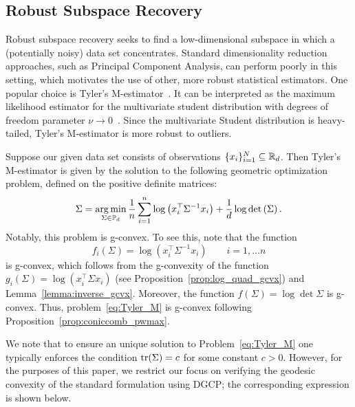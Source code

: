 \documentclass[twoside,11pt]{article}
\begin{document}
\subsection{Robust Subspace Recovery}
Robust subspace recovery seeks to find a low-dimensional subspace in which a (potentially noisy) data set concentrates. Standard dimensionality reduction approaches, such as Principal Component Analysis, can perform poorly in this setting, which motivates the use of other, more robust statistical estimators. One popular choice is Tyler's M-estimator~\citep{Tyler1987}. It can be interpreted as the maximum likelihood estimator for the multivariate student distribution with degrees of freedom parameter $\nu \to 0$~\citep{Maronna2006}. Since the multivariate Student distribution is heavy-tailed, Tyler's M-estimator is more robust to outliers.

Suppose our given data set consists of observations $\{x_i\}_{i=1}^N \subseteq \mathbb{R}_d$. Then Tyler's M-estimator is given by the solution to the following geometric optimization problem, defined on the positive definite matrices:
\begin{equation}\label{eq:Tyler_M}
    \Sigma = \operatorname*{arg\,min}_{\Sigma \in \mathbb{P}_d} \frac{1}{n}\sum_{i=1}^n \log \left(x_i^\top \Sigma^{-1}x_i\right) + \frac{1}{d}\log \det \left(\Sigma \right).
\end{equation}
Notably, this problem is g-convex. To see this, note that the function 
\[
f_i(\Sigma) = \log \left(x_i^\top \Sigma^{-1}x_i\right) \qquad i = 1, \ldots n
\]
is g-convex, which follows from the g-convexity of the function $g_i(\Sigma) = \log \left( x_i^\top \Sigma x_i\right)$ (see Proposition~\ref{prop:log_quad_gcvx}) and Lemma~\ref{lemma:inverse_gcvx}. Moreover, the function $f(\Sigma) = \log \det \Sigma$ is g-convex. Thus, problem~\ref{eq:Tyler_M} is g-convex following Proposition~\ref{prop:coniccomb_pwmax}.

 We note that to ensure an unique solution to Problem~\eqref{eq:Tyler_M} one typically enforces the condition $\text{tr} (\Sigma) = c$ for some constant $c > 0$. However, for the purposes of this paper, we restrict our focus on verifying the geodesic convexity of the standard formulation using DGCP; the corresponding expression is shown below.

\end{document}
